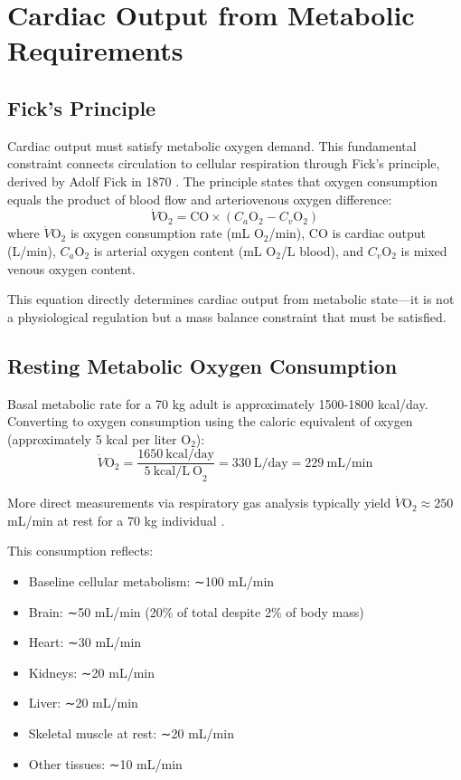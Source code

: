 \section{Cardiac Output from Metabolic Requirements}
\label{sec:cardiac}

\subsection{Fick's Principle}

Cardiac output must satisfy metabolic oxygen demand. This fundamental constraint connects circulation to cellular respiration through Fick's principle, derived by Adolf Fick in 1870 \cite{fick1870diffusion}. The principle states that oxygen consumption equals the product of blood flow and arteriovenous oxygen difference:
\begin{equation}
\dot{V}\mathrm{O}_{2} = \mathrm{CO} \times (C_{a}\mathrm{O}_{2} - C_{v}\mathrm{O}_{2})
\label{eq:fick}
\end{equation}
where $\dot{V}\mathrm{O}_{2}$ is oxygen consumption rate (mL O$_{2}$/min), CO is cardiac output (L/min), $C_{a}\mathrm{O}_{2}$ is arterial oxygen content (mL O$_{2}$/L blood), and $C_{v}\mathrm{O}_{2}$ is mixed venous oxygen content.

This equation directly determines cardiac output from metabolic state—it is not a physiological regulation but a mass balance constraint that must be satisfied.

\subsection{Resting Metabolic Oxygen Consumption}

Basal metabolic rate for a 70 kg adult is approximately 1500-1800 kcal/day. Converting to oxygen consumption using the caloric equivalent of oxygen (approximately 5 kcal per liter O$_{2}$):
\begin{equation}
\dot{V}\mathrm{O}_{2} = \frac{1650~\mathrm{kcal/day}}{5~\mathrm{kcal/L~O}_{2}} = 330~\mathrm{L/day} = 229~\mathrm{mL/min}
\end{equation}

More direct measurements via respiratory gas analysis typically yield $\dot{V}\mathrm{O}_{2} \approx 250$ mL/min at rest for a 70 kg individual \cite{weir1949new}.

This consumption reflects:
\begin{itemize}
\item Baseline cellular metabolism: ∼100 mL/min
\item Brain: ∼50 mL/min (20\% of total despite 2\% of body mass)
\item Heart: ∼30 mL/min
\item Kidneys: ∼20 mL/min
\item Liver: ∼20 mL/min
\item Skeletal muscle at rest: ∼20 mL/min
\item Other tissues: ∼10 mL/min
\end{itemize}

